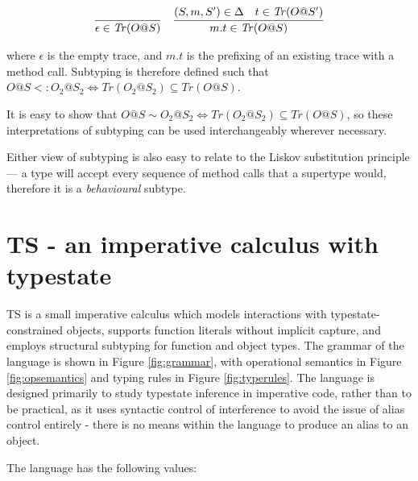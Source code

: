 \documentclass[preprint]{sigplanconf}
\newcommand{\Tr}{\mathit{Tr}}
\newcommand{\figref}[1]{Figure \ref{#1}}
\begin{document}
\[
\begin{tabular}{cc}
\infer{\epsilon \in \Tr(O@S)}{}
&
\infer{m . t \in \Tr(O@S)}
{(S, m, S') \in \Delta & t \in \Tr(O@S')}
\end{tabular}
\]

where $\epsilon$ is the empty trace, and $m . t$ is the 
prefixing of an existing trace with a method call.
Subtyping is therefore defined such that
$O@S <: O_2@S_2 \iff \Tr(O_2@S_2) \subseteq \Tr(O@S)$. 

It is easy to
show that $O@S \sim O_2@S_2 \iff \Tr(O_2@S_2) \subseteq \Tr(O@S)$, so these
interpretations of subtyping can be used interchangeably wherever necessary.

Either view of subtyping is also easy to relate to the Liskov substitution 
principle \cite{Liskov1987} --- a type will accept every sequence of
method calls that a supertype would, therefore it is a {\it behavioural}
subtype.

\section{TS - an imperative calculus with typestate}

TS is a small imperative calculus which models interactions with 
typestate-constrained objects, supports function literals without 
implicit capture, and employs structural subtyping for function and object
types.
The grammar of the language is shown 
in \figref{fig:grammar}, with operational semantics in \figref{fig:opsemantics} 
and typing rules in \figref{fig:typerules}.
The language is designed primarily
to study typestate inference in imperative code, rather than to 
be practical, as it uses syntactic control of interference \cite{Reynolds1978} 
to avoid the issue of alias control entirely - there is no means within the
language to produce an alias to an object.

The language has the following values:
\end{document}
